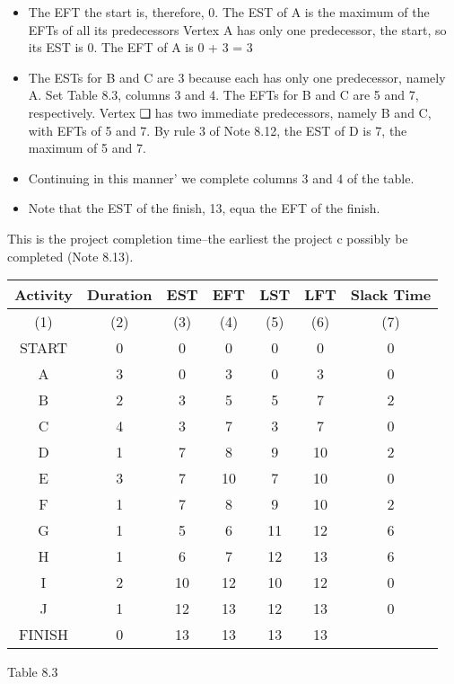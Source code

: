 \documentclass{article}
\begin{document}
\begin{itemize}
\item The EFT 
the start is, therefore, 0. The EST of A is the maximum of the EFTs of all its predecessors 
Vertex A has only one predecessor, the start, so its EST is 0. The EFT of A is 0 + 3 = 3 
\item The ESTs for B and C are 3 because each has only one predecessor, namely A. Set 
Table 8.3, columns 3 and 4. The EFTs for B and C are 5 and 7, respectively. Vertex ❑ 
has two immediate predecessors, namely B and C, with EFTs of 5 and 7. By rule 3 of 
Note 8.12, the EST of D is 7, the maximum of 5 and 7. \item Continuing in this manner' 
we complete columns 3 and 4 of the table.\item  Note that the EST of the finish, 13, equa 
the EFT of the finish. 
\end{itemize} This is the project completion time--the earliest the project c 
possibly be completed (Note 8.13). 
\begin{center}
\begin{tabular}{|c|c|c|c|c|c|c|}
Activity & Duration & EST & EFT & LST & LFT 
& Slack Time  \\ \hline 
(1) & (2)  & (3) & (4) & (5) & (6) & (7) \\ \hline

START & 0 & 0 & 0 & 0 & 0 & 0 \\ \hline

A & 3 & 0 & 3 & 0 & 3 & 0 \\ \hline 

B & 2 & 3 & 5 & 5 & 7 & 2 \\ \hline

C & 4 & 3 & 7 & 3 & 7 & 0 \\ \hline 

D & 1 & 7 & 8 & 9 & 10 & 2 \\ \hline 

E & 3 & 7 & 10 & 7 & 10 & 0 \\ \hline 

F & 1 & 7 & 8 & 9 & 10 & 2 \\ \hline 

G & 1 & 5 & 6 & 11 & 12 & 6 \\ \hline 

H & 1 & 6 & 7 & 12 & 13 & 6 \\ \hline 

I & 2 & 10 & 12 & 10 & 12 & 0 \\ \hline 

J & 1 & 12 & 13 & 12 & 13 & 0 \\ \hline 

FINISH & 0 & 13 & 13 & 13 & 13  & \\ \hline 
\end{tabular}
\end{center}
Table 8.3 
\end{document}
